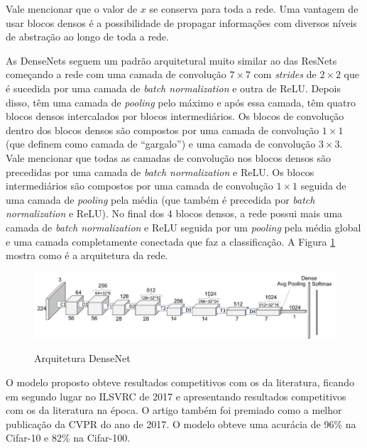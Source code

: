 Vale mencionar que o valor de $x$ se conserva para toda a rede. Uma vantagem de usar blocos densos é a possibilidade de propagar informações com diversos níveis de abstração ao longo de toda a rede.

As \ac{DenseNet}s seguem um padrão arquitetural muito similar ao das \ac{ResNet}s começando a rede com uma camada de convolução $7\times7$ com \textit{strides} de $2\times2$ que é sucedida por uma camada de \textit{batch normalization} e outra de \ac{ReLU}. Depois disso, têm uma camada de \textit{pooling} pelo máximo e após essa camada, têm quatro blocos densos intercalados por blocos intermediários. Os blocos de convolução dentro dos blocos densos são compostos por uma camada de convolução $1\times1$ (que  definem como camada de ``gargalo'') e uma camada de convolução $3\times3$. Vale mencionar que todas as camadas de convolução nos blocos densos são precedidas por uma camada de \textit{batch normalization} e \ac{ReLU}. Os blocos intermediários são compostos por uma camada de convolução $1\times1$ seguida de uma camada de \textit{pooling} pela média (que também é precedida por \textit{batch normalization} e \ac{ReLU}). No final dos 4 blocos densos, a rede possui mais uma camada de \textit{batch normalization} e \ac{ReLU} seguida por um \textit{pooling} pela média global e uma camada completamente conectada que faz a classificação. A Figura \ref{fig:archdensenet} mostra como é a arquitetura da rede.

\begin{figure}[H]
	\setlength{\abovecaptionskip}{0pt}
	\setlength{\belowcaptionskip}{0pt}
	\caption[Arquitetura DenseNet]{Arquitetura DenseNet}
	\centering
	\includegraphics[width=.7\textwidth]{imagem/0x_densenet_arch.png}
	\captionsetup{justification=centering}
	\label{fig:archdensenet}
\end{figure}

O modelo proposto obteve resultados competitivos com os da literatura, ficando em segundo lugar no \ac{ILSVRC} de 2017 e apresentando resultados competitivos com os da literatura na época. O artigo também foi premiado como a melhor publicação da \ac{CVPR} do ano de 2017. O modelo obteve uma acurácia de 96\% na Cifar-10 e 82\% na Cifar-100.

